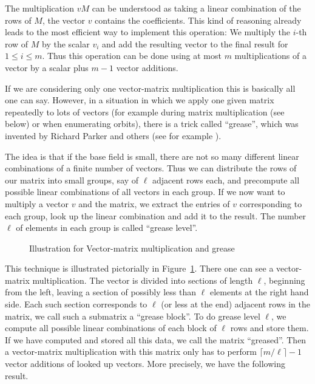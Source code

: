 The multiplication $vM$ can be understood as taking a linear combination
of the rows of $M$, the vector $v$ contains the coefficients. This
kind of reasoning already leads to the most efficient way to implement
this operation: We multiply the $i$-th row of $M$ by the scalar
$v_i$ and add the resulting vector to the final result for $1 \le i \le m$.
Thus this operation can be done using at most $m$ multiplications
of a vector by a scalar plus $m-1$ vector additions.

If we are considering only one vector-matrix multiplication this is basically
all one can say. However, in a situation in which we apply one given
matrix repeatedly to lots of vectors (for example during matrix 
multiplication (see below) or when enumerating orbits), there is a
trick called ``grease'', which was invented by Richard Parker and 
%
others (see for example \cite[Algorithm 6.2]{ahohop}).

The idea is that if the base field is small, there are not so many
different linear combinations of a finite number of vectors. Thus
we can distribute the rows of our matrix into small groups, say of
$\ell$ adjacent rows each, and precompute all possible linear combinations of
all vectors in each group. If we now want to multiply a vector $v$ and the 
matrix, we extract the entries of $v$ corresponding to each group,
look up the linear combination and add it to the result. The number
$\ell$ of elements in each group is called ``grease level''.

\begin{figure}[ht]
\begin{center}

\end{center}
\caption{Illustration for Vector-matrix multiplication and grease}
%
\label{grease}
\end{figure}

This technique is illustrated pictorially in Figure~\ref{grease}. There
one can see a vector-matrix multiplication. The vector is divided into
sections of length $\ell$, beginning from the left, leaving a section of
possibly less than $\ell$ elements at the right hand side. Each such section
corresponds to $\ell$ (or less at the end) adjacent rows in the matrix, we 
call such a submatrix a ``grease block''.
To do grease level $\ell$, we compute all possible linear combinations of
each block of $\ell$ rows and store them. If we have computed and stored
all this data, we call the matrix ``greased''.
%
Then a vector-matrix multiplication
with this matrix only has to perform $\lceil m/\ell \rceil -1$ vector additions
of looked up vectors. More precisely, we have the following result.

